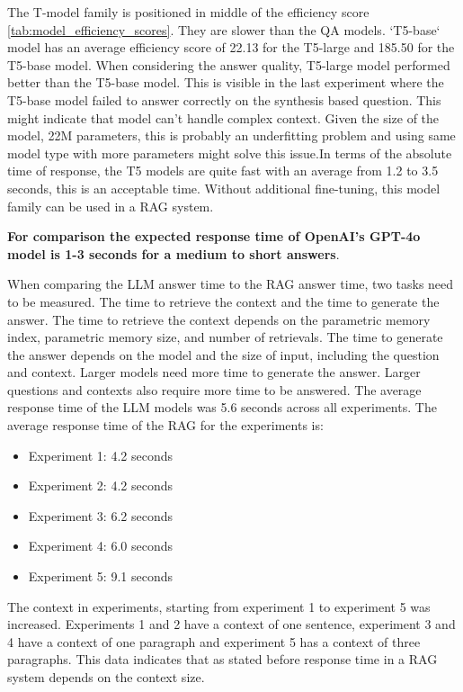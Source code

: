 \documentclass{wseas}
\begin{document}
The T-model family is positioned in middle of the efficiency score \autoref{tab:model_efficiency_scores}. They are slower than the QA models. 
`T5-base` model has an average efficiency score of 22.13 for the T5-large and 185.50 for the T5-base model. When considering the 
answer quality, T5-large model performed better than the T5-base model. This is visible in the last experiment where the T5-base model
failed to answer correctly on the synthesis based question. This might indicate that model can't handle complex context. 
Given the size of the model, 22M parameters, this is probably an underfitting problem and using same model type 
with more parameters might solve this issue.In terms of the absolute time of response, the T5 models
are quite fast with an average from 1.2 to 3.5 seconds, this is an acceptable time. Without additional
fine-tuning, this model family can be used in a RAG system.

\textbf{For comparison the expected response time of OpenAI's GPT-4o model is 1-3 seconds for a medium to short answers}.

When comparing the LLM answer time to the RAG answer time, two tasks need to be measured. The time to retrieve the context
and the time to generate the answer. The time to retrieve the context depends on the parametric memory index,
parametric memory size, and number of retrievals. The time to generate the answer depends on the model and the size of input,
including the question and context. Larger models need more time to generate the answer. Larger questions and contexts
also require more time to be answered. The average response time of the LLM models was 5.6 seconds across all experiments.
The average response time of the RAG for the experiments is:
\begin{itemize}
  \item Experiment 1: 4.2 seconds
  \item Experiment 2: 4.2 seconds
  \item Experiment 3: 6.2 seconds
  \item Experiment 4: 6.0 seconds
  \item Experiment 5: 9.1 seconds
\end{itemize}

The context in experiments, starting from experiment 1 to experiment 5 was increased. 
Experiments 1 and 2 have a context of one sentence, experiment 3 and 4 have a context
of one paragraph and experiment 5 has a context of three paragraphs.
This data indicates that as stated before response time in a RAG system depends on the context size.
\end{document}
